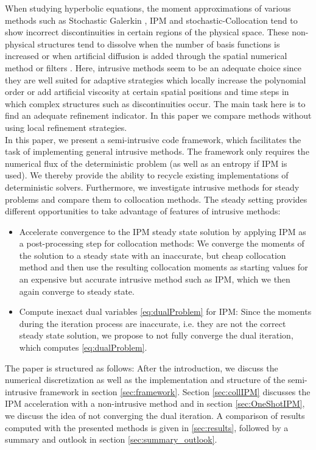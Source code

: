 When studying hyperbolic equations, the moment approximations of various methods such as Stochastic Galerkin \cite{le2004uncertainty}, IPM \cite{kusch2018filtered} and stochastic-Collocation \cite{barth2013non,dwight2013adaptive} tend to show incorrect discontinuities in certain regions of the physical space. These non-physical structures tend to dissolve when the number of basis functions is increased \cite{pettersson2009numerical,offner2017stability} or when artificial diffusion is added through the spatial numerical method \cite{offner2017stability} or filters \cite{kusch2018filtered}. Here, intrusive methods seem to be an adequate choice since they are well suited for adaptive strategies which locally increase the polynomial order \cite{tryoen2012adaptive,kroker2012finite,giesselmann2017posteriori} or add artificial viscosity \cite{kusch2018filtered} at certain spatial positions and time steps in which complex structures such as discontinuities occur. The main task here is to find an adequate refinement indicator. In this paper we compare methods without using local refinement strategies.\\

In this paper, we present a semi-intrusive code framework, which facilitates the task of implementing general intrusive methods. The framework only requires the numerical flux of the deterministic problem (as well as an entropy if IPM is used). We thereby provide the ability to recycle existing implementations of deterministic solvers.
Furthermore, we investigate intrusive methods for steady problems and compare them to collocation methods. The steady setting provides different opportunities to take advantage of features of intrusive methods: 
\begin{itemize}
\item Accelerate convergence to the IPM steady state solution by applying IPM as a post-processing step for collocation methods: We converge the moments of the solution to a steady state with an inaccurate, but cheap collocation method and then use the resulting collocation moments as starting values for an expensive but accurate intrusive method such as IPM, which we then again converge to steady state. 
\item Compute inexact dual variables \eqref{eq:dualProblem} for IPM: Since the moments during the iteration process are inaccurate, i.e. they are not the correct steady state solution, we propose to not fully converge the dual iteration, which computes \eqref{eq:dualProblem}. 
\end{itemize}

The paper is structured as follows: After the introduction, we discuss the numerical discretization as well as the implementation and structure of the semi-intrusive framework in section \ref{sec:framework}. Section \ref{sec:collIPM} discusses the IPM acceleration with a non-intrusive method and in section \ref{sec:OneShotIPM}, we discuss the idea of not converging the dual iteration. A comparison of results computed with the presented methods is given in \ref{sec:results}, followed by a summary and outlook in section \ref{sec:summary_outlook}.

